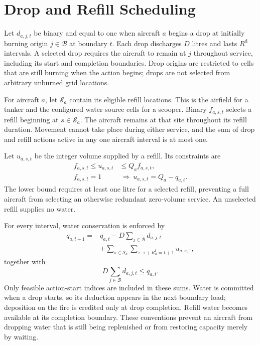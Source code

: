 \section{Drop and Refill Scheduling}
\label{sec:method-actions}

Let $d_{a,j,t}$ be binary and equal to one when aircraft $a$ begins a drop at initially burning origin $j\in\mathcal{B}$ at boundary $t$. Each drop discharges $D$ litres and lasts $R^{\mathrm{d}}$ intervals. A selected drop requires the aircraft to remain at $j$ throughout service, including its start and completion boundaries. Drop origins are restricted to cells that are still burning when the action begins; drops are not selected from arbitrary unburned grid locations.

For aircraft $a$, let $\mathcal{S}_a$ contain its eligible refill locations. This is the airfield for a tanker and the configured water-source cells for a scooper. Binary $f_{a,s,t}$ selects a refill beginning at $s\in\mathcal{S}_a$. The aircraft remains at that site throughout its refill duration. Movement cannot take place during either service, and the sum of drop and refill actions active in any one aircraft interval is at most one.

Let $u_{a,s,t}$ be the integer volume supplied by a refill. Its constraints are
\begin{align}
    f_{a,s,t}\leq u_{a,s,t}&\leq Q_a f_{a,s,t},\\
    f_{a,s,t}=1&\ \Longrightarrow\
    u_{a,s,t}=Q_a-q_{a,t}.
\end{align}
The lower bound requires at least one litre for a selected refill, preventing a full aircraft from selecting an otherwise redundant zero-volume service. An unselected refill supplies no water.

For every interval, water conservation is enforced by
\begin{equation}
\begin{split}
    q_{a,t+1}={}&q_{a,t}-D\sum_{j\in\mathcal{B}}d_{a,j,t}\\
    &+\sum_{s\in\mathcal{S}_a}
    \sum_{\tau:\,\tau+R_a^{\mathrm{f}}=t+1}u_{a,s,\tau},
\end{split}
\label{eq:static-water-balance}
\end{equation}
together with
\begin{equation}
    D\sum_{j\in\mathcal{B}}d_{a,j,t}\leq q_{a,t}.
\end{equation}
Only feasible action-start indices are included in these sums. Water is committed when a drop starts, so its deduction appears in the next boundary load; deposition on the fire is credited only at drop completion. Refill water becomes available at its completion boundary. These conventions prevent an aircraft from dropping water that is still being replenished or from restoring capacity merely by waiting.

